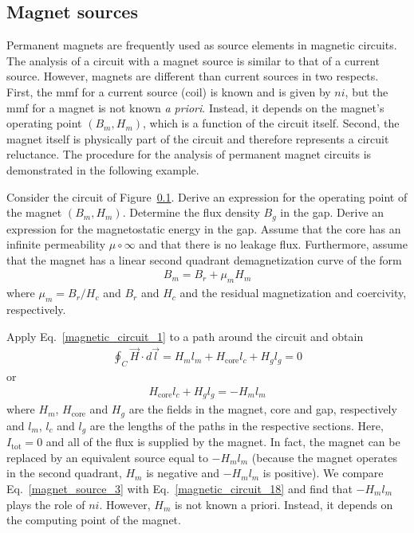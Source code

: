 \documentclass[12pt,a4paper,oneside]{book}
\begin{document}
\begin{onehalfspace}
\subsection{Magnet sources}
Permanent magnets are frequently used as source elements in magnetic circuits. The analysis of a circuit with a magnet source is similar to that of a current source. However, magnets are different than current sources in two respects. First, the mmf for a current source (coil) is known and is given by $ni$, but the mmf for a magnet is not known \textit{a priori}. Instead, it depends on the magnet's operating point $(B_m,H_m)$, which is a function of the circuit itself. Second, the magnet itself is physically part of the circuit and therefore represents a circuit reluctance. The procedure for the analysis of permanent magnet circuits is demonstrated in the following example.
\begin{example}
	Consider the circuit of Figure~\ref{}. Derive an expression for the operating point of the magnet $(B_m,H_m)$. Determine the flux density $B_g$ in the gap. Derive an expression for the magnetostatic energy in the gap. Assume that the core has an infinite permeability $\mu\circ\infty$ and that there is no leakage flux. Furthermore, assume that the magnet has a linear second quadrant demagnetization curve of the form
\begin{equation}\label{magnet_source_1}
	{\begin{aligned}
		B_m = B_r+\mu_m H_m
	\end{aligned}}
\end{equation}
where $\mu_m=B_r/H_c$ and $B_r$ and $H_c$ and the residual magnetization and coercivity, respectively.

Apply Eq.~\eqref{magnetic_circuit_1} to a path around the circuit and obtain 
\begin{equation}\label{magnet_source_2}
	{\begin{aligned}
	\oint_{C}\vec{H}\cdot d\vec{l}=H_ml_m+H_\text{core}l_c+H_gl_g=0
	\end{aligned}}
\end{equation}
or 
\begin{equation}\label{magnet_source_3}
	{\begin{aligned}
		H_\text{core}l_c+H_gl_g=-H_ml_m
	\end{aligned}}
\end{equation}
where $H_m$, $H_\text{core}$ and $H_g$ are the fields in the magnet, core and gap, respectively and $l_m$, $l_c$ and $l_g$ are the lengths of the paths in the respective sections. Here, $I_\text{tot}=0$ and all of the flux is supplied by the magnet. In fact, the magnet can be replaced by an equivalent source equal to $-H_ml_m$ (because the magnet operates in the second quadrant, $H_m$ is negative and $-H_ml_m$ is positive).  We compare Eq.~\eqref{magnet_source_3} with Eq.~\eqref{magnetic_circuit_18} and find that $-H_ml_m$ plays the role of $ni$. However, $H_m$ is not known a priori. Instead, it depends on the computing point of the magnet.


\end{example}
\end{onehalfspace}
\end{document}
